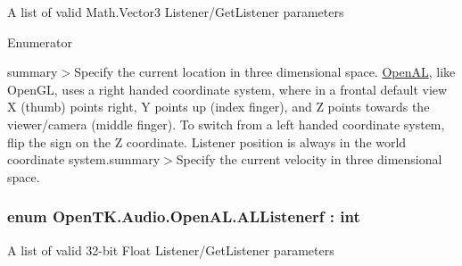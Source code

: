 A list of valid Math.\-Vector3 Listener/\-Get\-Listener parameters

\begin{Desc}
\item[Enumerator]\par
\begin{description}
\item[{\em 
\hypertarget{namespace_open_t_k_1_1_audio_1_1_open_a_l_aa9b3b935789dc118d03b512d09cc629da52f5e0bc3859bc5f5e25130b6c7e8881}{Position}\label{namespace_open_t_k_1_1_audio_1_1_open_a_l_aa9b3b935789dc118d03b512d09cc629da52f5e0bc3859bc5f5e25130b6c7e8881}
}]summary$>$Specify the current location in three dimensional space. \hyperlink{namespace_open_t_k_1_1_audio_1_1_open_a_l}{Open\-A\-L}, like Open\-G\-L, uses a right handed coordinate system, where in a frontal default view X (thumb) points right, Y points up (index finger), and Z points towards the viewer/camera (middle finger). To switch from a left handed coordinate system, flip the sign on the Z coordinate. Listener position is always in the world coordinate system.summary$>$Specify the current velocity in three dimensional space.\end{description}
\end{Desc}
\hypertarget{namespace_open_t_k_1_1_audio_1_1_open_a_l_a5bff3bb283f0f410f16305a3dcdb808b}{
\subsubsection[{A\-L\-Listenerf}]{\setlength{\rightskip}{0pt plus 5cm}enum {\bf Open\-T\-K.\-Audio.\-Open\-A\-L.\-A\-L\-Listenerf} \-: int}}\label{namespace_open_t_k_1_1_audio_1_1_open_a_l_a5bff3bb283f0f410f16305a3dcdb808b}


A list of valid 32-\/bit Float Listener/\-Get\-Listener parameters

